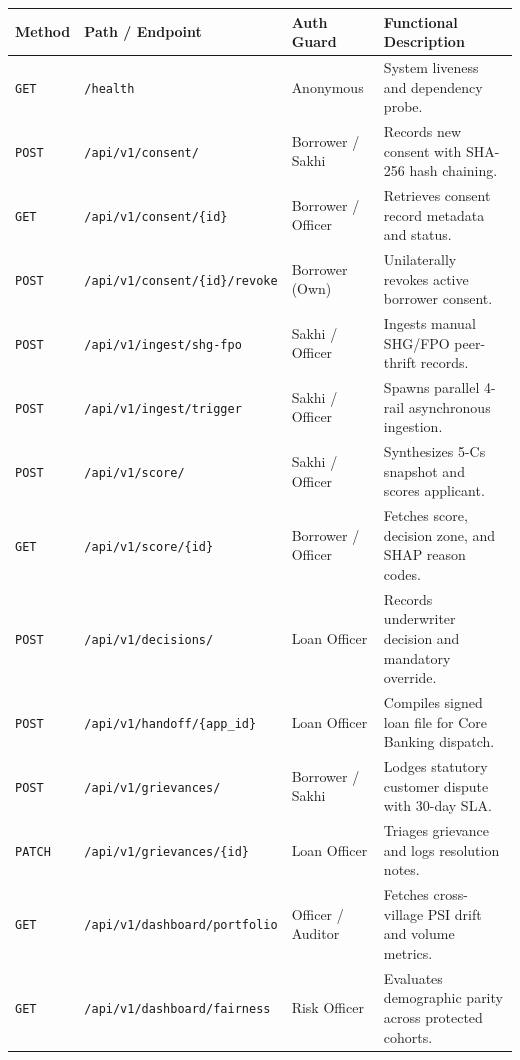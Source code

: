 \documentclass[11pt,a4paper,oneside]{report}
\begin{document}
\begin{table}[H]
\centering
\scriptsize
\renewcommand{\arraystretch}{1.15}
\begin{tabularx}{\textwidth}{l p{5.0cm} p{2.2cm} X}
  \toprule
  \textbf{Method} & \textbf{Path / Endpoint} & \textbf{Auth Guard} & \textbf{Functional Description} \\
  \midrule
  \texttt{GET} & \texttt{/health} & Anonymous & System liveness and dependency probe. \\
  \texttt{POST} & \texttt{/api/v1/consent/} & Borrower / Sakhi & Records new consent with SHA-256 hash chaining. \\
  \texttt{GET} & \texttt{/api/v1/consent/\{id\}} & Borrower / Officer & Retrieves consent record metadata and status. \\
  \texttt{POST} & \texttt{/api/v1/consent/\{id\}/revoke} & Borrower (Own) & Unilaterally revokes active borrower consent. \\
  \addlinespace
  \texttt{POST} & \texttt{/api/v1/ingest/shg-fpo} & Sakhi / Officer & Ingests manual SHG/FPO peer-thrift records. \\
  \texttt{POST} & \texttt{/api/v1/ingest/trigger} & Sakhi / Officer & Spawns parallel 4-rail asynchronous ingestion. \\
  \texttt{POST} & \texttt{/api/v1/score/} & Sakhi / Officer & Synthesizes 5-Cs snapshot and scores applicant. \\
  \texttt{GET} & \texttt{/api/v1/score/\{id\}} & Borrower / Officer & Fetches score, decision zone, and SHAP reason codes. \\
  \addlinespace
  \texttt{POST} & \texttt{/api/v1/decisions/} & Loan Officer & Records underwriter decision and mandatory override. \\
  \texttt{POST} & \texttt{/api/v1/handoff/\{app\_id\}} & Loan Officer & Compiles signed loan file for Core Banking dispatch. \\
  \texttt{POST} & \texttt{/api/v1/grievances/} & Borrower / Sakhi & Lodges statutory customer dispute with 30-day SLA. \\
  \texttt{PATCH} & \texttt{/api/v1/grievances/\{id\}} & Loan Officer & Triages grievance and logs resolution notes. \\
  \addlinespace
  \texttt{GET} & \texttt{/api/v1/dashboard/portfolio} & Officer / Auditor & Fetches cross-village PSI drift and volume metrics. \\
  \texttt{GET} & \texttt{/api/v1/dashboard/fairness} & Risk Officer & Evaluates demographic parity across protected cohorts. \\

\end{tabularx}
\end{table}
\end{document}
